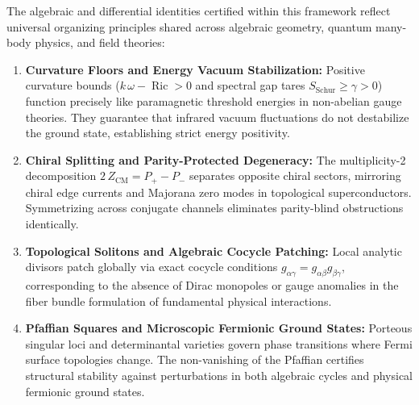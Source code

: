 \documentclass[11pt,a4paper]{article}
\theoremstyle{definition}
\begin{document}
The algebraic and differential identities certified within this framework reflect universal organizing principles shared across algebraic geometry, quantum many-body physics, and field theories:

\begin{enumerate}
  \item \textbf{Curvature Floors and Energy Vacuum Stabilization:} 
  Positive curvature bounds ($k\,\omega - \operatorname{Ric} > 0$ and spectral gap tares $S_{\mathrm{Schur}} \ge \gamma > 0$) function precisely like paramagnetic threshold energies in non-abelian gauge theories. They guarantee that infrared vacuum fluctuations do not destabilize the ground state, establishing strict energy positivity.
  
  \item \textbf{Chiral Splitting and Parity-Protected Degeneracy:} 
  The multiplicity-2 decomposition $2\,Z_{\mathrm{CM}} = P_+ - P_-$ separates opposite chiral sectors, mirroring chiral edge currents and Majorana zero modes in topological superconductors. Symmetrizing across conjugate channels eliminates parity-blind obstructions identically.
  
  \item \textbf{Topological Solitons and Algebraic Cocycle Patching:} 
  Local analytic divisors patch globally via exact cocycle conditions $g_{\alpha\gamma} = g_{\alpha\beta} g_{\beta\gamma}$, corresponding to the absence of Dirac monopoles or gauge anomalies in the fiber bundle formulation of fundamental physical interactions.
  
  \item \textbf{Pfaffian Squares and Microscopic Fermionic Ground States:} 
  Porteous singular loci and determinantal varieties govern phase transitions where Fermi surface topologies change. The non-vanishing of the Pfaffian certifies structural stability against perturbations in both algebraic cycles and physical fermionic ground states.
\end{enumerate}
\end{document}
